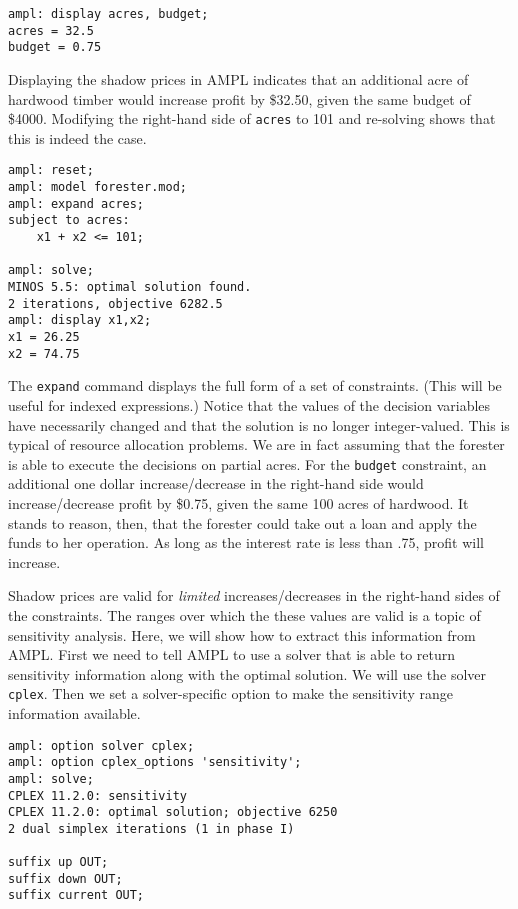 \begin{Verbatim}[samepage=true]
ampl: display acres, budget;
acres = 32.5
budget = 0.75
\end{Verbatim}

Displaying the shadow prices in AMPL indicates that an additional acre
of hardwood timber would increase profit by \$32.50, given the same
budget of \$4000.  Modifying the right-hand side of \texttt{acres} to
101 and re-solving shows that this is indeed the case.

\begin{Verbatim}[samepage=true]
ampl: reset;
ampl: model forester.mod;
ampl: expand acres;
subject to acres:
	x1 + x2 <= 101;

ampl: solve;
MINOS 5.5: optimal solution found.
2 iterations, objective 6282.5
ampl: display x1,x2;
x1 = 26.25
x2 = 74.75
\end{Verbatim}

The \texttt{expand} command displays the full form of a set of
constraints.  (This will be useful for indexed expressions.) Notice
that the values of the decision variables have necessarily changed and
that the solution is no longer integer-valued.  This is typical of
resource allocation problems. We are in fact assuming that the
forester is able to execute the decisions on partial acres.  For the
\texttt{budget} constraint, an additional one dollar increase/decrease
in the right-hand side would increase/decrease profit by \$0.75, given
the same 100 acres of hardwood. It stands to reason, then, that the
forester could take out a loan and apply the funds to her
operation. As long as the interest rate is less than .75, profit will
increase.

Shadow prices are valid for \emph{limited} increases/decreases in the
right-hand sides of the constraints. The ranges over which the these
values are valid is a topic of sensitivity analysis. Here, we will
show how to extract this information from AMPL. First we need to tell
AMPL to use a solver that is able to return sensitivity information
along with the optimal solution. We will use the solver
\texttt{cplex}. Then we set a solver-specific option to make the
sensitivity range information available.

\begin{Verbatim}[samepage=true]
ampl: option solver cplex;
ampl: option cplex_options 'sensitivity';
ampl: solve;
CPLEX 11.2.0: sensitivity
CPLEX 11.2.0: optimal solution; objective 6250
2 dual simplex iterations (1 in phase I)

suffix up OUT;
suffix down OUT;
suffix current OUT;
\end{Verbatim}

